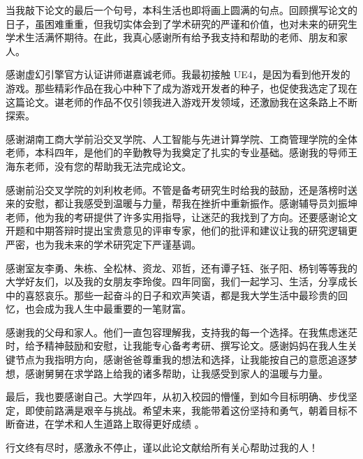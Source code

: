 \begin{acknowledgements} 

当我敲下论文的最后一个句号，本科生活也即将画上圆满的句点。回顾撰写论文的日子，虽困难重重，但我切实体会到了学术研究的严谨和价值，也对未来的研究生学术生活满怀期待。在此，我真心感谢所有给予我支持和帮助的老师、朋友和家人。

感谢虚幻引擎官方认证讲师谌嘉诚老师。我最初接触 UE4，是因为看到他开发的游戏。那些精彩作品在我心中种下了成为游戏开发者的种子，也促使我选定了现在这篇论文。谌老师的作品不仅引领我进入游戏开发领域，还激励我在这条路上不断探索。

感谢湖南工商大学前沿交叉学院、人工智能与先进计算学院、工商管理学院的全体老师，本科四年，是他们的辛勤教导为我奠定了扎实的专业基础。感谢我的导师王海东老师，没有您的帮助我无法完成论文。

感谢前沿交叉学院的刘利枚老师。不管是备考研究生时给我的鼓励，还是落榜时送来的安慰，都让我感受到温暖与力量，帮我在挫折中重新振作。感谢辅导员刘振坤老师，他为我的考研提供了许多实用指导，让迷茫的我找到了方向。还要感谢论文开题和中期答辩时提出宝贵意见的评审专家，他们的批评和建议让我的研究逻辑更严密，也为我未来的学术研究定下严谨基调。

感谢室友李勇、朱栋、全松林、资龙、邓哲，还有谭子钰、张子阳、杨钊等等我的大学好友们，以及我的女朋友李玲俊。四年同窗，我们一起学习、生活，分享成长中的喜怒哀乐。那些一起奋斗的日子和欢声笑语，都是我大学生活中最珍贵的回忆，也会成为我人生中最重要的一笔财富。

感谢我的父母和家人。他们一直包容理解我，支持我的每一个选择。在我焦虑迷茫时，给予精神鼓励和安慰，让我能专心备考考研、撰写论文。感谢妈妈在我人生关键节点为我指明方向，感谢爸爸尊重我的想法和选择，让我能按自己的意愿追逐梦想，感谢舅舅在求学路上给我的诸多帮助，让我感受到家人的温暖与力量。

最后，我也要感谢自己。大学四年，从初入校园的懵懂，到如今目标明确、步伐坚定，即使前路满是艰辛与挑战。希望未来，我能带着这份坚持和勇气，朝着目标不断奋进，在学术和人生道路上取得更好成绩 。

行文终有尽时，感激永不停止，谨以此论文献给所有关心帮助过我的人！

\end{acknowledgements}
